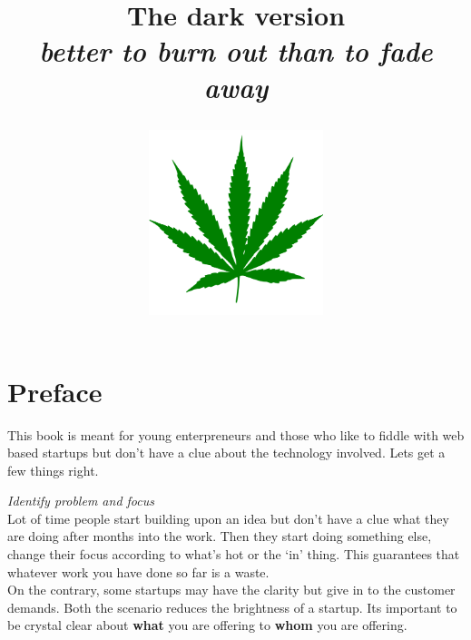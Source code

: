 \documentclass[12pt]{book}
\title{The dark version\\ \textit{better to burn out than to fade away}
\begin{center}\includegraphics[width=2in]{org/art/cannabis.png}\end{center}
}
\begin{document}
\maketitle


\chapter{Preface}
\noindent
This book is meant for young enterpreneurs and those who like to fiddle with web based startups but don't have a clue about the technology involved.
Lets get a few things right.

\noindent\textit{Identify problem and focus}\\
Lot of time people start building upon an idea but don't have a clue what they are doing after months into the work. Then they start doing something else, change their focus according to what's hot or the `in' thing. This guarantees that whatever work you have done so far is a waste.\\
On the contrary, some startups may have the clarity but give in to the customer demands. Both the scenario reduces the brightness of a startup.
Its important to be crystal clear about \textbf{what} you are offering to \textbf{whom} you are offering.

\end{document}

